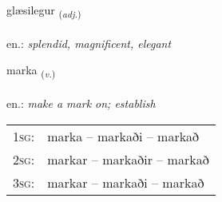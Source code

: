 \documentclass[frontgrid, backgrid]{flacards}\usepackage[]{graphicx}\usepackage[]{xcolor}
\begin{document}
\renewcommand{\flhead}{\vskip5pt \fboxsep=0pt {\small\bfseries\footnotesize Lýsingarorð | Adjective}}
\renewcommand{\fcfoot}{\vskip5pt \fboxsep=0pt \hspace{2pt}{\small\bfseries\footnotesize 2K}}

\renewcommand{\blhead}{\vskip5pt {\small\bfseries\footnotesize Lýsingarorð | Adjective }}
\renewcommand{\bcfoot}{\vskip5pt \hspace{2pt}{\small\bfseries\footnotesize 2K}}


{glæsilegur \small{\textsubscript{(\textit{adj.})}} \\[1ex] %
\textphonetic{[klaiːsɪlɛɣʏr]} \\
en.: \emph{splendid, magnificent, elegant} \\  [2ex]
\renewcommand*{\arraystretch}{0.8}
}

\renewcommand{\flhead}{\vskip5pt \fboxsep=0pt {\small\bfseries\footnotesize Sagnorð | Verb}}
\renewcommand{\fcfoot}{\vskip5pt \fboxsep=0pt \hspace{2pt}{\small\bfseries\footnotesize 2K}}

\renewcommand{\blhead}{\vskip5pt {\small\bfseries\footnotesize Sagnorð | Verb }}
\renewcommand{\bcfoot}{\vskip5pt \hspace{2pt}{\small\bfseries\footnotesize 2K}}


{marka \small{\textsubscript{(\textit{v.})}} \\[1ex] %
\textphonetic{[mar̥ka]} \\
en.: \emph{make a mark on; establish} \\  [2ex]
\renewcommand*{\arraystretch}{0.8}
\begin{tabular}{p{1cm}l}
\textsc{1sg}: & marka -- markaði -- markað \\ 
\textsc{2sg}: & markar -- markaðir -- markað \\ 
\textsc{3sg}: & markar -- markaði -- markað \\ 
\end{tabular}
}
\end{document}
